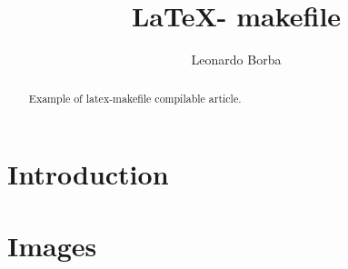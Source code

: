 \documentclass{article}
\title{\LaTeX - makefile}
\author{Leonardo Borba}
\begin{document}
\maketitle

\begin{abstract}
Example of latex-makefile compilable article.
\end{abstract}

\section{Introduction}


\section{Images}




\end{document}
